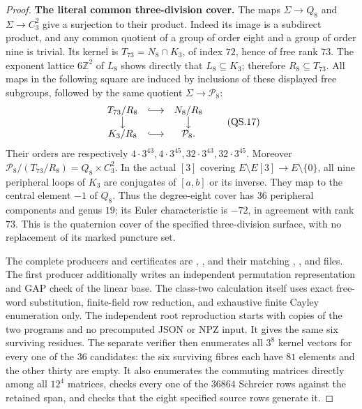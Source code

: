 \begin{proof}
\textbf{The literal common three-division cover.}
The maps $\Sigma\to Q_8$ and $\Sigma\to C_3^2$ give a
surjection to their product.  Indeed its image is a subdirect
product, and any common quotient of a group of order eight
and a group of order nine is trivial.  Its kernel is
$T_{73}=N_8\cap K_3$, of index $72$, hence of free rank $73$.
The exponent lattice $6\mathbb Z^2$ of $L_8$ shows directly
that $L_8\subseteq K_3$; therefore $R_8\subseteq T_{73}$.
All maps in the following square are induced by inclusions
of these displayed free subgroups, followed by the same
quotient $\Sigma\to\mathcal P_8$:
\[
\begin{array}{ccc}
 T_{73}/R_8&\lhook\joinrel\longrightarrow&N_8/R_8\\
 \big\downarrow&&\big\downarrow\\
 K_3/R_8&\lhook\joinrel\longrightarrow&\mathcal P_8.
\end{array}                                               \tag{QS.17}
\]
Their orders are respectively
$4\cdot3^{43},4\cdot3^{45},32\cdot3^{43},32\cdot3^{45}$.
Moreover
$\mathcal P_8/(T_{73}/R_8)=Q_8\times C_3^2$.
In the actual $[3]$ covering $E\setminus E[3]\to
E\setminus\{0\}$, all nine peripheral loops of $K_3$
are conjugates of $[a,b]$ or its inverse.  They map to the
central element $-1$ of $Q_8$.  Thus the degree-eight cover
has $36$ peripheral components and genus $19$; its Euler
characteristic is $-72$, in agreement with rank $73$.
This is the quaternion cover of the specified three-division
surface, with no replacement of its marked puncture set.

The complete producers and certificates are
,
,
and their matching , , and
 files.  The first producer additionally writes
an independent permutation representation and GAP check of
the linear base.  The class-two calculation itself uses
exact free-word substitution, finite-field row reduction,
and exhaustive finite Cayley enumeration only.
The independent root reproduction starts with copies of the
two programs and no precomputed JSON or NPZ input.  It gives
the same six surviving residues.  The separate verifier
 then enumerates
all $3^8$ kernel vectors for every one of the $36$ candidates:
the six surviving fibres each have $81$ elements and the
other thirty are empty.  It also enumerates the commuting
matrices directly among all $12^4$ matrices, checks every
one of the $36864$ Schreier rows against the retained span,
and checks that the eight specified source rows generate it.
\end{proof}
